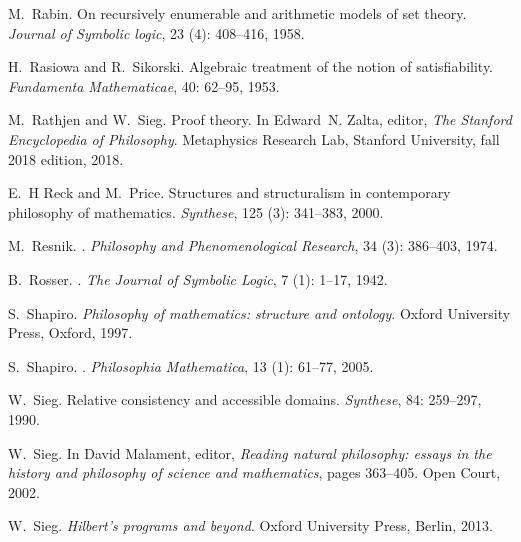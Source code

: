 \documentclass[11pt,fleqn,leqno]{article}
\begin{document}
\begin{thebibliography}{118}
M.~Rabin.
\newblock On recursively enumerable and arithmetic models of set theory.
\newblock \emph{Journal of Symbolic logic}, 23 (4): 408--416,
  1958.

H.~Rasiowa and R.~Sikorski.
\newblock Algebraic treatment of the notion of satisfiability.
\newblock \emph{Fundamenta Mathematicae}, 40: 62--95, 1953.

M.~Rathjen and W.~Sieg.
\newblock Proof theory.
\newblock In Edward~N. Zalta, editor, \emph{The Stanford Encyclopedia of
  Philosophy}. Metaphysics Research Lab, Stanford University, fall 2018
  edition, 2018.

E.~H Reck and M.~Price.
\newblock Structures and structuralism in contemporary philosophy of
  mathematics.
\newblock \emph{Synthese}, 125 (3): 341--383, 2000.

M.~Resnik.
.
\newblock \emph{Philosophy and Phenomenological Research}, 34
  (3): 386--403, 1974.

B.~Rosser.
.
\newblock \emph{The Journal of Symbolic Logic}, 7 (1): 1--17,
  1942.

S.~Shapiro.
\newblock \emph{Philosophy of mathematics: structure and ontology}.
\newblock Oxford University Press, Oxford, 1997.

S.~Shapiro.
.
\newblock \emph{Philosophia Mathematica}, 13 (1): 61--77,
  2005.

W.~Sieg.
\newblock Relative consistency and accessible domains.
\newblock \emph{Synthese}, 84: 259--297, 1990.

W.~Sieg.
\newblock In David Malament, editor, \emph{Reading natural philosophy: essays
  in the history and philosophy of science and mathematics}, pages 363--405.
  Open Court, 2002.

W.~Sieg.
\newblock \emph{Hilbert's programs and beyond}.
\newblock Oxford University Press, Berlin, 2013.


\end{thebibliography}
\end{document}

